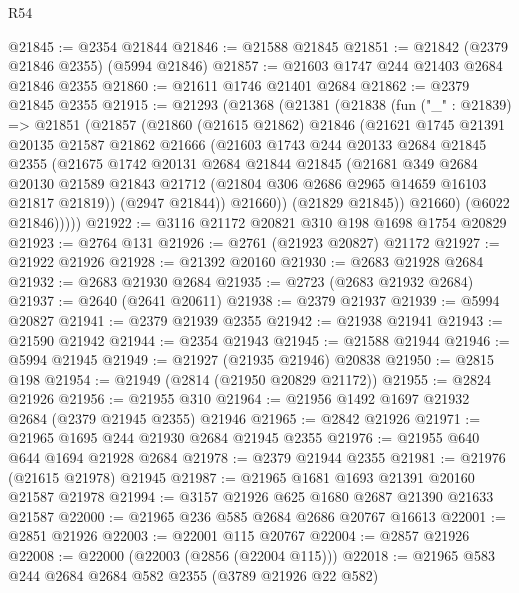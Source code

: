 \begin{lexlean}{R54}
\begin{coremodule}
@21845 := @2354 @21844
@21846 := @21588 @21845
@21851 := @21842 (@2379 @21846 @2355) (@5994 @21846)
@21857 := @21603 @1747 @244 @21403 @2684 @21846 @2355
@21860 := @21611 @1746 @21401 @2684
@21862 := @2379 @21845 @2355
@21915 := @21293
    (@21368
      (@21381
        (@21838
          (fun ("_" : @21839) =>
          @21851
            (@21857
              (@21860
                (@21615 @21862)
                @21846
                (@21621
                  @1745
                  @21391
                  @20135
                  @21587
                  @21862
                  @21666
                  (@21603
                    @1743
                    @244
                    @20133
                    @2684
                    @21845
                    @2355
                    (@21675
                      @1742
                      @20131
                      @2684
                      @21844
                      @21845
                      (@21681
                        @349
                        @2684
                        @20130
                        @21589
                        @21843
                        @21712
                        (@21804 @306 @2686 @2965 @14659 @16103 @21817 @21819))
                      (@2947 @21844))
                    @21660))
                (@21829 @21845))
              @21660)
            (@6022 @21846)))))
@21922 := @3116 @21172 @20821 @310 @198 @1698 @1754 @20829
@21923 := @2764 @131
@21926 := @2761 (@21923 @20827) @21172
@21927 := @21922 @21926
@21928 := @21392 @20160
@21930 := @2683 @21928 @2684
@21932 := @2683 @21930 @2684
@21935 := @2723 (@2683 @21932 @2684)
@21937 := @2640 (@2641 @20611)
@21938 := @2379 @21937
@21939 := @5994 @20827
@21941 := @2379 @21939 @2355
@21942 := @21938 @21941
@21943 := @21590 @21942
@21944 := @2354 @21943
@21945 := @21588 @21944
@21946 := @5994 @21945
@21949 := @21927 (@21935 @21946) @20838
@21950 := @2815 @198
@21954 := @21949 (@2814 (@21950 @20829 @21172))
@21955 := @2824 @21926
@21956 := @21955 @310
@21964 := @21956 @1492 @1697 @21932 @2684 (@2379 @21945 @2355) @21946
@21965 := @2842 @21926
@21971 := @21965 @1695 @244 @21930 @2684 @21945 @2355
@21976 := @21955 @640 @644 @1694 @21928 @2684
@21978 := @2379 @21944 @2355
@21981 := @21976 (@21615 @21978) @21945
@21987 := @21965 @1681 @1693 @21391 @20160 @21587 @21978
@21994 := @3157 @21926 @625 @1680 @2687 @21390 @21633 @21587
@22000 := @21965 @236 @585 @2684 @2686 @20767 @16613
@22001 := @2851 @21926
@22003 := @22001 @115 @20767
@22004 := @2857 @21926
@22008 := @22000 (@22003 (@2856 (@22004 @115)))
@22018 := @21965 @583 @244 @2684 @2684 @582 @2355 (@3789 @21926 @22 @582)

\end{coremodule}
\end{lexlean}
